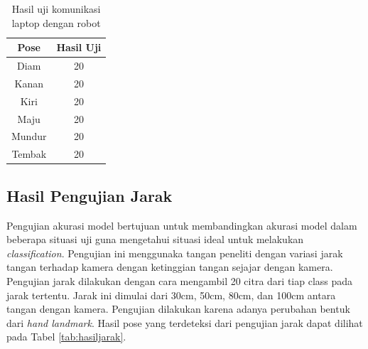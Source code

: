 \documentclass[conference]{IEEEtran}
\begin{document}
\begin{table}[H]
    \centering
    \caption{Hasil uji komunikasi laptop dengan robot}
    \label{tab:hasulujipose}
    \begin{tabular}{|c|c|}
    \hline
    Pose   &  Hasil Uji\\ \hline
    Diam   & 20              \\ \hline
    Kanan  & 20             \\ \hline
    Kiri   & 20              \\ \hline
    Maju   & 20              \\ \hline
    Mundur & 20              \\ \hline
    Tembak & 20              \\ \hline
    \end{tabular}
  \end{table}

\subsection{Hasil Pengujian Jarak}
Pengujian akurasi model bertujuan untuk membandingkan akurasi model dalam beberapa situasi uji guna mengetahui situasi ideal untuk melakukan \emph{classification}. Pengujian ini menggunaka tangan peneliti dengan variasi jarak tangan terhadap kamera dengan ketinggian tangan sejajar dengan kamera. Pengujian jarak dilakukan dengan cara mengambil 20 citra dari tiap class pada jarak tertentu. Jarak ini dimulai dari 30cm, 50cm, 80cm, dan 100cm antara tangan dengan kamera. Pengujian dilakukan karena adanya perubahan bentuk dari \emph{hand landmark}. Hasil pose yang terdeteksi dari pengujian jarak dapat dilihat pada Tabel \ref{tab:hasiljarak}.
\end{document}
